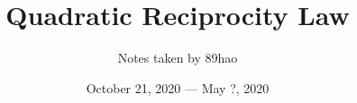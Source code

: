 \documentclass[a4paper,12pt]{book}
\begin{document}
\title{Quadratic Reciprocity Law}
\author{\large Notes taken by 89hao}
\date{October 21, 2020 --- May ?, 2020}  
\maketitle
\tableofcontents


%
%
\end{document}

